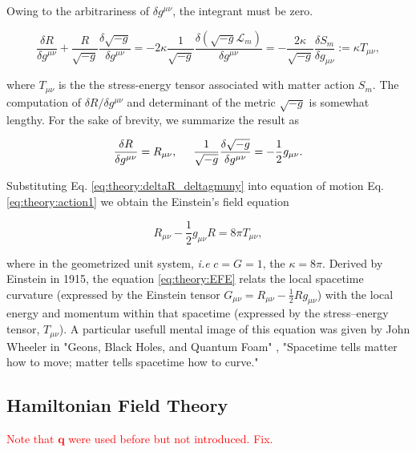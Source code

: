 \documentclass[11pt,a4paper,headinclude=true,DIV=14,BCOR=8mm,chapterprefix,listof=totoc,twoside,openright,abstracton]{scrbook}
\newcommand{\red}[1]{\textcolor{red}{#1}}
\begin{document}
Owing to the arbitrariness of $\delta g^{\mu\nu}$, the integrant must be zero. 

\begin{equation}
\frac{\delta R}{\delta g^{\mu\nu}} + \frac{R}{\sqrt{-g}}\frac{\delta\sqrt{-g}}{\delta g^{\mu\nu}} = -2\kappa\frac{1}{\sqrt{-g}}\frac{\delta(\sqrt{-g}\mathcal{L}_m)}{\delta g^{\mu\nu}} = -\frac{2\kappa}{\sqrt{-g}}\frac{\delta S_m}{\delta g_{\mu\nu}} := \kappa T_{\mu\nu},
\label{eq:theory:action1}
\end{equation}

where $T_{\mu\nu}$ is the the stress-energy tensor associated with matter action $S_m$. 
The computation of $\delta R / \delta g^{\mu\nu}$ and determinant of the metric $\sqrt{-g}$ is somewhat lengthy. For the sake of brevity, we summarize the result as

\begin{equation}
    \frac{\delta R}{\delta g^{\mu\nu}} = R_{\mu\nu}, \hspace{5mm}
    \frac{1}{\sqrt{-g}}\frac{\delta\sqrt{-g}}{\delta g^{\mu\nu}} = -\frac{1}{2}g_{\mu\nu}.
    \label{eq:theory:deltaR_deltagmuny}
\end{equation}

Substituting Eq. \ref{eq:theory:deltaR_deltagmuny} into equation of motion Eq.  \ref{eq:theory:action1} we obtain the Einstein's field equation 

\begin{equation}
R_{\mu\nu} -\frac{1}{2}g_{\mu\nu}R=8\pi T_{\mu\nu},
\label{eq:theory:EFE}
\end{equation}

where in the geometrized unit system, \textit{i.e} $c=G=1$, the $\kappa=8\pi$. Derived by Einstein in 1915, the equation \ref{eq:theory:EFE} relats the local spacetime curvature (expressed by the Einstein tensor $G_{\mu\nu}=R_{\mu\nu} - \frac{1}{2}Rg_{\mu\nu}$) with the local energy and momentum within that spacetime (expressed by the stress–energy tensor, $T_{\mu\nu}$). A particular usefull mental image of this equation was given by John Wheeler in "Geons, Black Holes, and Quantum Foam" \cite{Wheeler:2010}, "Spacetime tells matter how to move; matter tells spacetime how to curve."


\subsection{Hamiltonian Field Theory}
\red{Note that $\boldsymbol{q}$ were used before but not introduced. Fix.}
\end{document}
